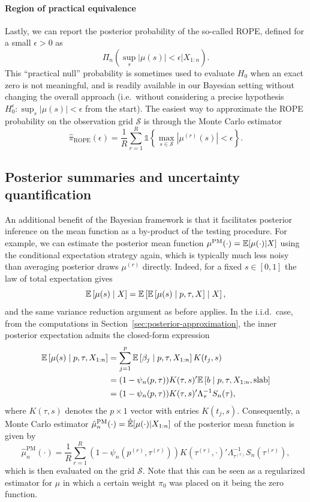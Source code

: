 \paragraph{Region of practical equivalence} Lastly, we can report the posterior probability of the so-called \acf{ROPE}, defined for a small \(\epsilon > 0\) as 
\[
\Pi_n\left(\sup_s |\mu(s)| < \epsilon \mathrel{\big\vert} X_{1:n}\right).
\]
This ``practical null'' probability is sometimes used to evaluate \(H_0\) when an exact zero is not meaningful, and is readily available in our Bayesian setting without changing the overall approach (i.e.\ without considering a precise hypothesis \(H_0^\epsilon:\sup_s|\mu(s)| < \epsilon\) from the start). The easiest way to approximate the \acs{ROPE} probability on the observation grid \(\mathcal S\) is through the Monte Carlo estimator
\[
\hat\pi_{\text{ROPE}}(\epsilon) = \frac{1}{R}\sum_{r=1}^R \mathds{1}\left\{\max_{s\in\mathcal S} |\mu^{(r)}(s)| < \epsilon\right\}.
\]

\subsection{Posterior summaries and uncertainty quantification}\label{sec:posterior-summaries}

An additional benefit of the Bayesian framework is that it facilitates posterior inference on the mean function as a by-product of the testing procedure. For example, we can estimate the posterior mean function \(\mu^{\text{PM}}(\cdot)=\mathbb{E}[\mu(\cdot)|X]\) using the conditional expectation strategy again, which is typically much less noisy than averaging posterior draws \(\mu^{(r)}\) directly. Indeed, for a fixed \(s\in[0,1]\) the law of total expectation gives 
\[
  \mathbb{E}\left[\mu(s)\mid X\right] = \mathbb{E}\left[\mathbb{E}\left[\mu(s)\mid p, \tau, X\right]\mid X\right],
\]
and the same variance reduction argument as before applies. In the i.i.d.\ case, from the computations in Section~\ref{sec:posterior-approximation}, the inner posterior expectation admits the closed-form expression 
\begin{align*}
\mathbb{E}\left[\mu(s)\mid p, \tau, X_{1:n}\right] &= \sum_{j=1}^p \mathbb{E}\left[\beta_j\mid p, \tau, X_{1:n}\right]K(t_j, s) \\
&=(1-\psi_n(p,\tau))K(\tau, s)'\mathbb{E}\left[b\mid p, \tau, X_{1:n}, \text{slab}\right]\\
&= (1-\psi_n(p, \tau))K(\tau, s)'\Lambda_\tau^{-1}S_n(\tau),
\end{align*}
where \(K(\tau, s)\) denotes the \(p\times 1\) vector with entries \(K(t_j, s)\). Consequently, a Monte Carlo estimator \(\hat\mu_n^{\text{PM}}(\cdot) = \hat{\mathbb{E}}[\mu(\cdot)|X_{1:n}]\) of the posterior mean function is given by
\[
\hat\mu_n^{\text{PM}}(\cdot) =\frac{1}{R} \sum_{r=1}^R (1-\psi_n(p^{(r)}, \tau^{(r)}))K(\tau^{(r)}, \cdot)'\Lambda_{\tau^{(r)}}^{-1}S_n(\tau^{(r)}),
\]
which is then evaluated on the grid \(\mathcal S\). Note that this can be seen as a regularized estimator for \(\mu\) in which a certain weight \(\pi_0\) was placed on it being the zero function.

